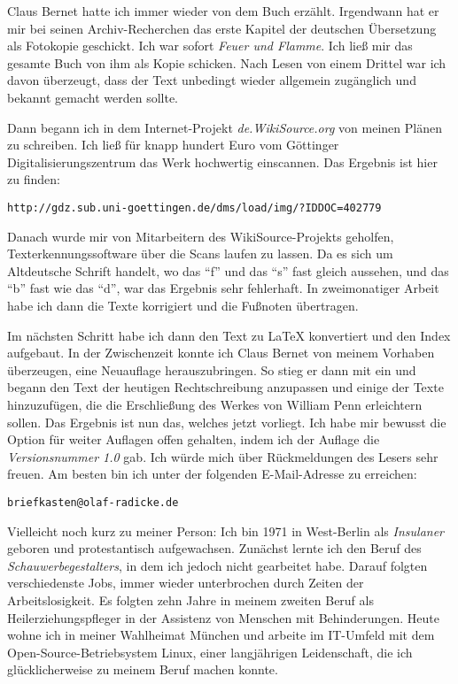 \medskip

Claus Bernet hatte ich immer wieder von dem Buch erzählt. Irgendwann hat er mir
bei seinen Archiv-Recherchen das erste Kapitel der deutschen Übersetzung als
Fotokopie geschickt. Ich war sofort \textit{Feuer und
Flamme}. Ich ließ mir das gesamte Buch von ihm als Kopie schicken. Nach Lesen
von einem Drittel war
ich davon überzeugt, dass der Text unbedingt wieder allgemein zugänglich und
bekannt gemacht werden sollte.

\medskip

Dann begann ich in dem Internet-Projekt \textit{de.WikiSource.org} von meinen
Plänen
zu schreiben. Ich ließ für knapp hundert Euro vom Göttinger
Digitalisierungszentrum das Werk hochwertig einscannen. Das Ergebnis ist hier zu
finden:

\begin{center}
\texttt{http://gdz.sub.uni-goettingen.de/dms/load/img/?IDDOC=402779}
\end{center}

Danach wurde mir von Mitarbeitern des WikiSource-Projekts geholfen,
Texterkennungssoftware über die Scans laufen zu lassen. Da es sich um
Altdeutsche Schrift handelt, wo das "`f"' und das "`s"' fast gleich aussehen,
und das "`b"' fast wie das "`d"', war das Ergebnis sehr fehlerhaft. In
zweimonatiger Arbeit habe ich dann die Texte korrigiert und die Fußnoten
übertragen.

\medskip

Im nächsten Schritt habe ich dann den Text zu \LaTeX{} konvertiert und den Index
aufgebaut. In der Zwischenzeit konnte ich Claus Bernet von meinem Vorhaben
überzeugen, eine Neuauflage herauszubringen. So stieg er dann mit ein und begann
den Text der heutigen Rechtschreibung anzupassen und einige der Texte
hinzuzufügen, die die Erschließung des Werkes von William Penn erleichtern sollen.
Das Ergebnis ist nun das, welches jetzt vorliegt. Ich habe mir bewusst die
Option für weiter Auflagen offen gehalten, indem ich der Auflage die
\textit{Versionsnummer 1.0} gab. Ich würde mich über Rückmeldungen des Lesers
sehr freuen. Am besten bin ich unter der folgenden E-Mail-Adresse zu erreichen:

\begin{center}
\texttt{briefkasten@olaf-radicke.de}
\end{center}

Vielleicht noch kurz zu meiner Person: Ich bin 1971 in West-Berlin
als \textit{Insulaner} geboren und protestantisch aufgewachsen. Zunächst lernte
ich den Beruf des \textit{Schauwerbegestalters}, in dem ich jedoch nicht gearbeitet
habe. Darauf folgten verschiedenste Jobs, immer wieder unterbrochen durch Zeiten
der Arbeitslosigkeit. Es folgten zehn Jahre in meinem zweiten Beruf 
als Heilerziehungspfleger in der Assistenz von Menschen mit Behinderungen.
Heute wohne ich in meiner Wahlheimat München und arbeite im IT-Umfeld mit dem 
Open-Source-Betriebsystem Linux, einer langjährigen Leidenschaft, die ich 
glücklicherweise zu meinem Beruf machen konnte.

